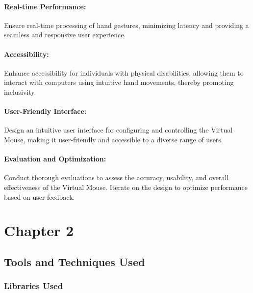 \documentclass[12pt,a4paper]{report}
\begin{document}
  
\subsubsection{{Real-time Performance:}}Ensure real-time processing of hand gestures, minimizing latency and providing a seamless and responsive user experience. 


\subsubsection{{Accessibility:}}Enhance accessibility for individuals with physical disabilities, allowing them to interact with computers using intuitive hand movements, thereby promoting inclusivity. 

\subsubsection{User-Friendly Interface: }Design an intuitive user interface for configuring and controlling the Virtual Mouse, making it user-friendly and accessible to a diverse range of users. 

 

\subsubsection{Evaluation and Optimization:}Conduct thorough evaluations to assess the accuracy, usability, and overall effectiveness of the Virtual Mouse. Iterate on the design to optimize performance based on user feedback. 



	{\vfill \chapter*{\centering \vfill Chapter 2 \vfill}\vfill}
	\thispagestyle{empty}
	\newpage
	\label{Tools and Techniques Used}
	\section{Tools and Techniques Used}
	\label{Libraries Used}
		\subsection{Libraries Used}
		\label{MediaPipe}
		\vspace{0.5cm}
\end{document}
